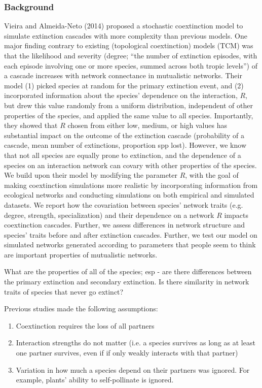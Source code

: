 \documentclass[12pt]{article}
\begin{document}
\subsubsection*{Background}
Vieira and Almeida-Neto (2014) proposed a stochastic coextinction model to simulate extinction cascades with more complexity than previous models. One major finding contrary to existing (topological coextinction) models (TCM) was that the likelihood and severity (degree; ``the number of extinction episodes, with each episode involving one or more species, summed across both tropic levels'') of a cascade increases with network connectance in mutualistic networks. Their model (1) picked species at random for the primary extinction event, and (2) incorporated information about the species' dependence on the interaction, $R$, but drew this value randomly from a uniform distribution, independent of other properties of the species, and applied the same value to all species. Importantly, they showed that $R$ chosen from either low, medium, or high values has substantial impact on the outcome of the extinction cascade (probability of a cascade, mean number of extinctions, proportion spp lost). However, we know that not all species are equally prone to extinction, and the dependence of a species on an interaction network can covary with other properties of the species. We build upon their model by modifying the parameter $R$, with the goal of making coextinction simulations more realistic by incorporating information from ecological networks and conducting simulations on both empirical and simulated datasets. We report how the covariation between species' network traits (e.g. degree, strength, specialization) and their dependence on a network $R$ impacts coextinction cascades. Further, we assess differences in network structure and species' traits before and after extinction cascades.
Further, we test our model on simulated networks generated according to parameters that people seem to think are important properties of mutualistic networks. 

What are the properties of all of the species; esp - are there differences between the primary extinction and secondary extinction. Is there similarity in network traits of species that never go extinct? 

Previous studies made the following assumptions:
\begin{enumerate}
	\item Coextinction requires the loss of all partners
	\item Interaction strengths do not matter (i.e. a species survives as long as at least one partner survives, even if if only weakly interacts with that partner)
	\item Variation in how much a species depend on their partners was ignored. For example, plants' ability to self-pollinate is ignored.
\end{enumerate}
\end{document}
